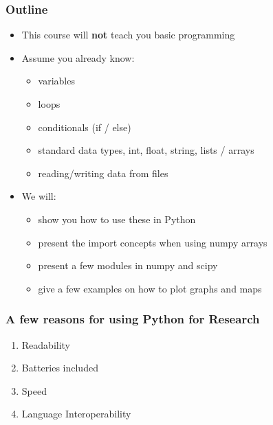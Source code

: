 \begin{frame}[fragile]
    \frametitle{Outline}
    \begin{itemize}
        \item This course will \textbf{not} teach you basic programming
        \item Assume you already know:
        \begin{itemize}
            \item variables
            \item loops
            \item conditionals (if / else)
            \item standard data types, int, float, string, lists / arrays
            \item reading/writing data from files
        \end{itemize}
        \item We will:
        	\begin{itemize}
        	  \item show you how to use these in Python 
		      \item present the import concepts when using numpy arrays
		      \item present a few modules in numpy and scipy
		      \item give a few examples on how to plot graphs and maps
        	\end{itemize} 
    \end{itemize}
\end{frame}

\begin{frame}[fragile]
    \frametitle{A few reasons for using Python for Research}
    \begin{enumerate}
        \item Readability
        \item Batteries included
        \item Speed
        \item Language Interoperability
    \end{enumerate}
\end{frame}



